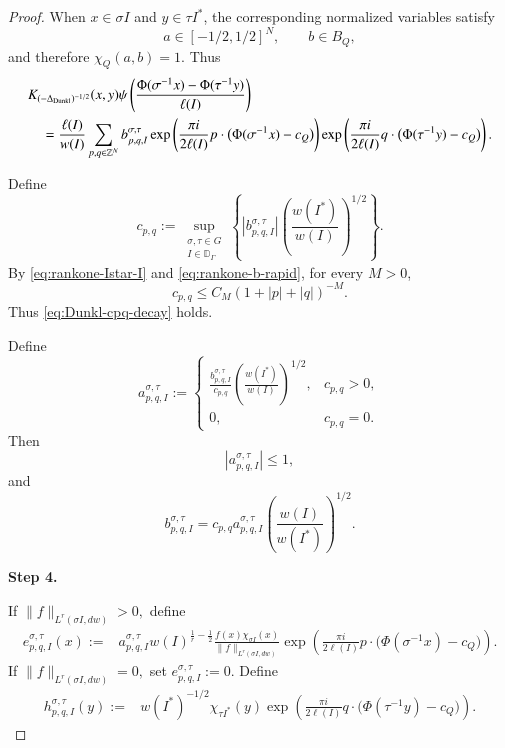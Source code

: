 \documentclass[12pt]{amsart}
\begin{document}
\begin{proof}
When $x\in\sigma I$ and $y\in\tau I^\ast$, the corresponding
normalized variables satisfy
\[
a\in[-1/2,1/2]^N,
\qquad
b\in B_Q,
\]
and therefore $\chi_Q(a,b)=1$. Thus
\begin{align}
&K_{(-\Delta_{{\rm Dunkl}})^{-1/2}}(x,y)
\psi\left(
\frac{
\Phi(\sigma^{-1}x)-\Phi(\tau^{-1}y)
}{
\ell(I)
}
\right)
\nonumber\\
&\quad=
\frac{\ell(I)}{w(I)}
\sum_{p,q\in\mathbb Z^N}
b_{p,q,I}^{\sigma,\tau}
\exp\left(
\frac{\pi i}{2\ell(I)}
p\cdot
\bigl(\Phi(\sigma^{-1}x)-c_Q\bigr)
\right)
\exp\left(
\frac{\pi i}{2\ell(I)}
q\cdot
\bigl(\Phi(\tau^{-1}y)-c_Q\bigr)
\right).
\label{eq:rankone-local-K-Fourier}
\end{align}

Define
\begin{equation}\label{eq:rankone-cpq}
c_{p,q}
:=
\sup_{\substack{\sigma,\tau\in G\\I\in\mathbb D_\Gamma}}
\left\{
|b_{p,q,I}^{\sigma,\tau}|
\left(
\frac{w(I^\ast)}{w(I)}
\right)^{1/2}
\right\}.
\end{equation}
By \eqref{eq:rankone-Istar-I} and
\eqref{eq:rankone-b-rapid}, for every $M>0$,
\[
c_{p,q}
\leq
C_M(1+|p|+|q|)^{-M}.
\]
Thus \eqref{eq:Dunkl-cpq-decay} holds.

Define
\[
a_{p,q,I}^{\sigma,\tau}
:=
\begin{cases}
\displaystyle
\frac{b_{p,q,I}^{\sigma,\tau}}{c_{p,q}}
\left(
\frac{w(I^\ast)}{w(I)}
\right)^{1/2},
&c_{p,q}>0,\\[3mm]
0,&c_{p,q}=0.
\end{cases}
\]
Then
\begin{equation}\label{eq:rankone-a-bound}
|a_{p,q,I}^{\sigma,\tau}|\leq1,
\end{equation}
and
\begin{equation}\label{eq:rankone-b-factor}
b_{p,q,I}^{\sigma,\tau}
=
c_{p,q}a_{p,q,I}^{\sigma,\tau}
\left(
\frac{w(I)}{w(I^\ast)}
\right)^{1/2}.
\end{equation}

\medskip
\noindent
\textbf{Step 4. }

If
$
\|f\|_{L^r(\sigma I,dw)}>0,
$
define
\begin{align}
e_{p,q,I}^{\sigma,\tau}(x)
:={}&
a_{p,q,I}^{\sigma,\tau}
w(I)^{\frac1r-\frac12}
\frac{
f(x)\chi_{\sigma I}(x)
}{
\|f\|_{L^r(\sigma I,dw)}
}
\exp\left(
\frac{\pi i}{2\ell(I)}
p\cdot
\bigl(\Phi(\sigma^{-1}x)-c_Q\bigr)
\right).
\label{eq:rankone-e}
\end{align}
If
$
\|f\|_{L^r(\sigma I,dw)}=0,
$
set
$
e_{p,q,I}^{\sigma,\tau}:=0.
$
Define
\begin{align}
h_{p,q,I}^{\sigma,\tau}(y)
:={}&
w(I^\ast)^{-1/2}
\chi_{\tau I^\ast}(y)
\exp\left(
\frac{\pi i}{2\ell(I)}
q\cdot
\bigl(\Phi(\tau^{-1}y)-c_Q\bigr)
\right).
\label{eq:rankone-h}
\end{align}


\end{proof}
\end{document}
